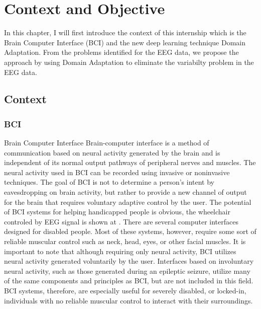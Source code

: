 
\chapter{Context and Objective} %

\label{Chapter2} %

In this chapter, I will first introduce the context of this internship which is the Brain Computer Interface (BCI) and the new deep learning technique Domain Adaptation. From the problems identified for the EEG data, we propose the approach by using Domain Adaptation to eliminate the variabilty problem in the EEG data.


\section{Context}


\subsection{BCI}{Brain Computer Interface}
Brain-computer interface is a method of communication based on neural activity generated by the brain and is independent of its normal output pathways of peripheral nerves and muscles. The neural activity used in BCI can be recorded using invasive or noninvasive techniques. The goal of BCI is not to determine a person's intent by eavesdropping on brain activity, but rather to provide a new channel of output for the brain that requires voluntary adaptive control by the user.\cite{wolpaw2000brain} The potential of BCI systems for helping handicapped people is obvious, the wheelchair controled by EEG signal is shown at . There are several computer interfaces designed for disabled people.\cite{wickelgren2003brain} Most of these systems, however, require some sort of reliable muscular control such as neck, head, eyes, or other facial muscles. It is important to note that although requiring only neural activity, BCI utilizes neural activity generated voluntarily by the user. Interfaces based on involuntary neural activity, such as those generated during an epileptic seizure, utilize many of the same components and principles as BCI, but are not included in this field. BCI systems, therefore, are especially useful for severely disabled, or locked-in, individuals with no reliable muscular control to interact with their surroundings.

